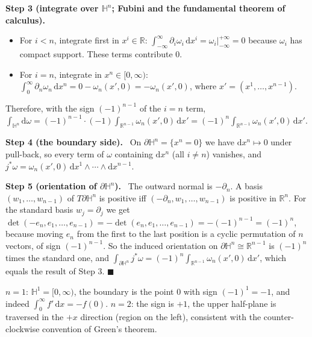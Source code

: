 \documentclass[11pt,a4paper]{article}
\numberwithin{equation}{section}
\theoremstyle{definition}
\theoremstyle{plain}
\newcommand{\Step}[2]{\textbf{Step #1 (#2).}\ }
\newcommand{\R}{\mathbb{R}}
\newcommand{\dd}{\mathrm{d}}
\newcommand{\pb}{{}^{*}}                            %
\begin{document}
\Step{3}{integrate over $\mathbb H^n$; Fubini and the fundamental theorem of calculus}
\begin{itemize}
\item For $i<n$, integrate first in $x^i\in\R$: $\int_{-\infty}^{\infty}\partial_i\omega_i\,\dd x^i=\omega_i\big|_{-\infty}^{+\infty}=0$ because $\omega_i$ has compact support. These terms contribute $0$.
\item For $i=n$, integrate in $x^n\in[0,\infty)$: $\int_0^\infty\partial_n\omega_n\,\dd x^n=0-\omega_n(x',0)=-\omega_n(x',0)$, where $x'=(x^1,\dots,x^{n-1})$.
\end{itemize}
Therefore, with the sign $(-1)^{n-1}$ of the $i=n$ term, $\int_{\mathbb H^n}\dd\omega=(-1)^{n-1}\cdot(-1)\int_{\R^{n-1}}\omega_n(x',0)\,\dd x'=(-1)^n\int_{\R^{n-1}}\omega_n(x',0)\,\dd x'$.

\Step{4}{the boundary side} On $\partial\mathbb H^n=\{x^n=0\}$ we have $\dd x^n\mapsto0$ under pull-back, so every term of $\omega$ containing $\dd x^n$ (all $i\neq n$) vanishes, and $j\pb\omega=\omega_n(x',0)\,\dd x^1\wedge\cdots\wedge\dd x^{n-1}$.

\Step{5}{orientation of $\partial\mathbb H^n$} The outward normal is $-\partial_n$. A basis $(w_1,\dots,w_{n-1})$ of $T\partial\mathbb H^n$ is positive iff $(-\partial_n,w_1,\dots,w_{n-1})$ is positive in $\R^n$. For the standard basis $w_j=\partial_j$ we get
$\det(-e_n,e_1,\dots,e_{n-1})=-\det(e_n,e_1,\dots,e_{n-1})=-(-1)^{n-1}=(-1)^n$, because moving $e_n$ from the first to the last position is a cyclic permutation of $n$ vectors, of sign $(-1)^{n-1}$. So the induced orientation on $\partial\mathbb H^n\cong\R^{n-1}$ is $(-1)^n$ times the standard one, and $\int_{\partial\mathbb H^n}j\pb\omega=(-1)^n\int_{\R^{n-1}}\omega_n(x',0)\,\dd x'$, which equals the result of Step 3. \hfill$\blacksquare$

\begin{specialcase}[sanity checks of the sign: $n=1$ and $n=2$]
$n=1$: $\mathbb H^1=[0,\infty)$, the boundary is the point $0$ with sign $(-1)^1=-1$, and indeed $\int_0^\infty f'\,\dd x=-f(0)$.
$n=2$: the sign is $+1$, the upper half-plane is traversed in the $+x$ direction (region on the left), consistent with the counter-clockwise convention of Green's theorem.
\end{specialcase}
\end{document}
